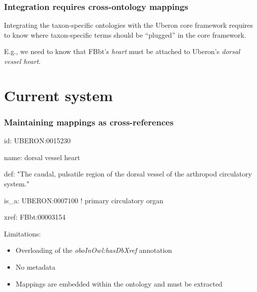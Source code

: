 \begin{frame}
  \frametitle{Integration requires cross-ontology mappings}

  \begin{block}{}
    Integrating the taxon-specific ontologies with the Uberon core framework
    requires to know where taxon-specific terms should be ``plugged'' in the
    core framework.

    E.g., we need to know that FBbt's \emph{heart} must be attached to Uberon's
    \emph{dorsal vessel heart}.
  \end{block}
\end{frame}

\section{Current system}

\begin{frame}
  \frametitle{Maintaining mappings as cross-references}

  \begin{block}{}\ttfamily
[Term]

id: UBERON:0015230

name: dorsal vessel heart

def: "The caudal, pulsatile region of the dorsal vessel of the arthropod circulatory system."

is\_a: UBERON:0007100 ! primary circulatory organ

xref: FBbt:00003154
  \end{block}

  Limitations:
  \begin{itemize}
    \item Overloading of the \emph{oboInOwl:hasDbXref} annotation
    \item No metadata
    \item Mappings are embedded within the ontology and must be extracted
  \end{itemize}
\end{frame}

